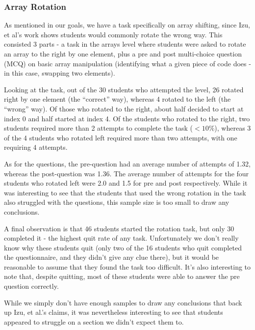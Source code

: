 \documentclass[11pt]{article}
\begin{document}
\subsubsection{Array Rotation}
As mentioned in our goals, we have a task specifically on array shifting, since Izu, et al\cite{izuloop}'s work shows students would commonly rotate the wrong way. This consisted 3 parts - a task in the arrays level where students were asked to rotate an array to the right by one element, plus a pre and post multi-choice question (MCQ) on basic array manipulation (identifying what a given piece of code does - in this case, swapping two elements).\par
Looking at the task, out of the 30 students who attempted the level, 26 rotated right by one element (the ``correct'' way), whereas 4 rotated to the left (the ``wrong'' way). Of those who rotated to the right, about half decided to start at index 0 and half started at index 4. Of the students who rotated to the right, two students required more than 2 attempts to complete the task ($<10\%$), whereas 3 of the 4 students who rotated left required more than two attempts, with one requiring 4 attempts.\par
As for the questions, the pre-question had an average number of attempts of 1.32, whereas the post-question was 1.36. The average number of attempts for the four students who rotated left were 2.0 and 1.5 for pre and post respectively. While it was interesting to see that the students that used the wrong rotation in the task also struggled with the questions, this sample size is too small to draw any conclusions.\par
A final observation is that 46 students started the rotation task, but only 30 completed it - the highest quit rate of any task. Unfortunately we don't really know why these students quit (only two of the 16 students who quit completed the questionnaire, and they didn't give any clue there), but it would be reasonable to assume that they found the task too difficult. It's also interesting to note that, despite quitting, most of these students were able to answer the pre question correctly.\par
While we simply don't have enough samples to draw any conclusions that back up Izu, et al.'s claims, it was nevertheless interesting to see that students appeared to struggle on a section we didn't expect them to.
\end{document}
